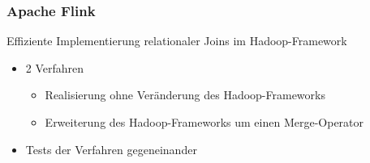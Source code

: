 \begin{frame}
\frametitle{Apache Flink}
Effiziente Implementierung relationaler Joins im Hadoop-Framework
\hspace{8pt}
\begin{itemize}
  \item 2 Verfahren
  \begin{itemize}
    \item Realisierung ohne Veränderung des Hadoop-Frameworks
    \item Erweiterung des Hadoop-Frameworks um einen
    Merge-Operator
  \end{itemize}
  \item Tests der Verfahren gegeneinander
\end{itemize}
\end{frame}
